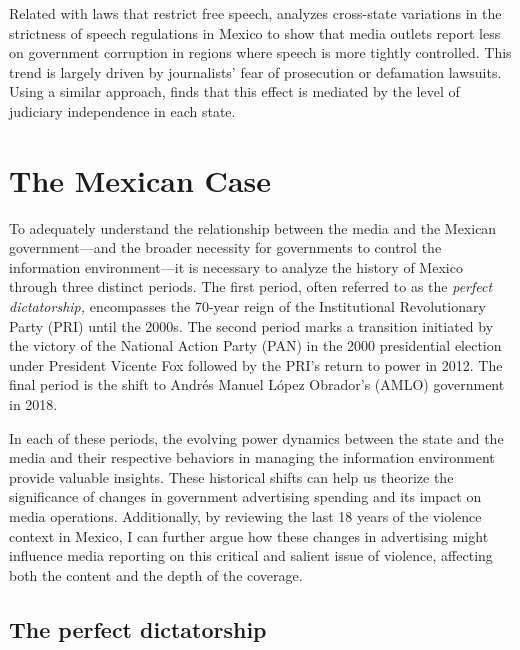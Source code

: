 Related with laws that restrict free speech, \cite{MexicanPressStanigAJPS} analyzes cross-state variations in the strictness of speech regulations in Mexico to show that media outlets report less on government corruption in regions where speech is more tightly controlled. This trend is largely driven by journalists' fear of prosecution or defamation lawsuits. Using a similar approach, \cite{Journalism-Salazar-RevMex} finds that this effect is mediated by the level of judiciary independence in each state.

\section{The Mexican Case}

To adequately understand the relationship between the media and the Mexican government—and the broader necessity for governments to control the information environment—it is necessary to analyze the history of Mexico through three distinct periods. The first period, often referred to as the \textit{perfect dictatorship,} encompasses the 70-year reign of the Institutional Revolutionary Party (PRI) until the 2000s. The second period marks a transition initiated by the victory of the National Action Party (PAN) in the 2000 presidential election under President Vicente Fox followed by the PRI's return to power in 2012. The final period is the shift to Andrés Manuel López Obrador's (AMLO) government in 2018.

In each of these periods, the evolving power dynamics between the state and the media and their respective behaviors in managing the information environment provide valuable insights. These historical shifts can help us theorize the significance of changes in government advertising spending and its impact on media operations. Additionally, by reviewing the last 18 years of the violence context in Mexico, I can further argue how these changes in advertising might influence media reporting on this critical and salient issue of violence, affecting both the content and the depth of the coverage.

\subsection{The perfect dictatorship}

